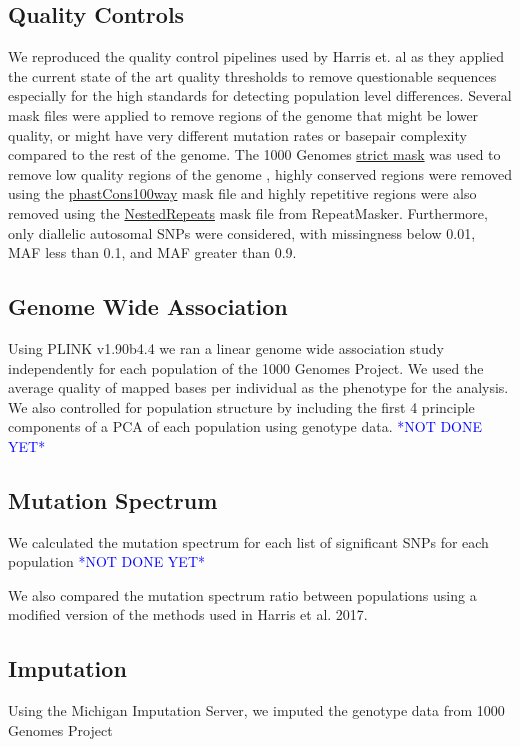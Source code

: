 \documentclass[12pt,twocolumn]{article}
\newcommand{\todo}[1]{\textcolor{blue}{*#1*}}
\begin{document}
\subsection{Quality Controls}
We reproduced the quality control pipelines used by Harris et. al as they applied the current state of the art quality thresholds to remove questionable sequences especially for the high standards for detecting population level differences. 
Several mask files were applied to remove regions of the genome that might be lower quality, or might have very different mutation rates or basepair complexity compared to the rest of the genome. 
The  1000 Genomes \href{http://ftp.1000genomes.ebi.ac.uk/vol1/ftp/release/20130502/supporting/accessible_genome_masks/20141020.strict_mask.whole_genome.bed}{strict mask} was used to remove low quality regions of the genome , highly conserved regions were removed using the \href{http://hgdownload.cse.ucsc.edu/goldenPath/hg19/database/phastConsElements100way.txt.gz}{phastCons100way} mask file and highly repetitive regions were also removed using the \href{http://hgdownload.cse.ucsc.edu/goldenpath/hg19/database/nestedRepeats.txt.gz}{NestedRepeats} mask file from RepeatMasker. 
Furthermore, only diallelic autosomal SNPs were considered, with missingness below 0.01, MAF less than 0.1, and MAF greater than 0.9.

\subsection{Genome Wide Association}

Using PLINK v1.90b4.4 we ran a linear genome wide association study independently for each population of the 1000 Genomes Project. We used the average quality of mapped bases per individual as the phenotype for the analysis. We also controlled for population structure by including the first 4 principle components of a PCA of each population using genotype data. \todo{NOT DONE YET}

\subsection{Mutation Spectrum}
We calculated the mutation spectrum for each list of significant SNPs for each population \todo{NOT DONE YET}

We also compared the mutation spectrum ratio between populations using a modified version of the methods used in Harris et al. 2017. 

\subsection{Imputation}
Using the Michigan Imputation Server, we imputed the genotype data from 1000 Genomes Project




  
\end{document}
